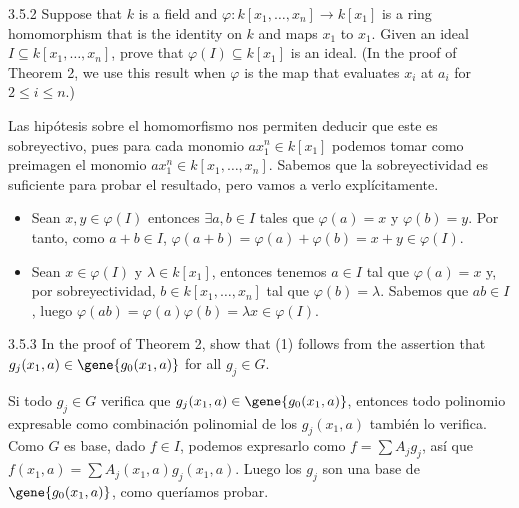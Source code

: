 \documentclass[twoside]{article}
\begin{document}
\begin{ejercicio}{3.5.2}
Suppose that $k$ is a field and $\varphi \colon k[x_1,\dots,x_n] \to k[x_1]$ is a ring homomorphism that is the identity on $k$ and maps $x_1$ to $x_1$.
Given an ideal $I \subseteq k[x_1,\dots,x_n]$, prove that $\varphi(I) \subseteq k[x_1]$ is an ideal.
(In the proof of Theorem 2, we use this result when $\varphi$ is the map that evaluates $x_i$ at $a_i$ for $2 \leq i \leq n$.)
\end{ejercicio}
\begin{solucion}
Las hipótesis sobre el homomorfismo nos permiten deducir que este es sobreyectivo, pues para cada monomio $ax_1^n \in k[x_1]$ podemos tomar como preimagen el monomio $ax_1^n \in k[x_1,\dots,x_n]$. Sabemos que la sobreyectividad es suficiente para probar el resultado, pero vamos a verlo explícitamente.
\begin{itemize}
\item Sean $x,y \in \varphi(I)$ entonces $\exists a,b\in I$ tales que $\varphi(a)=x$ y $\varphi(b)=y$. Por tanto, como $a+b \in I$, $\varphi(a+b)=\varphi(a)+\varphi(b)=x+y\in \varphi(I)$.
\item Sean $x \in \varphi(I)$ y $\lambda \in k[x_1]$, entonces tenemos $a\in I$ tal que $\varphi(a)=x$ y, por sobreyectividad, $b\in k[x_1,\dotsc,x_n]$ tal que $\varphi(b)=\lambda$. Sabemos que $ab\in I$, luego $\varphi(ab)=\varphi(a)\varphi(b)=\lambda x \in \varphi(I)$.
\end{itemize}
\end{solucion}

\newpage

\begin{ejercicio}{3.5.3}
In the proof of Theorem 2, show that (1) follows from the assertion that $g_j(x_1,a) \in \gene{g_0(x_1,a)}$ for all $g_j \in G$.
\end{ejercicio}
\begin{solucion}
Si todo $g_j \in G$ verifica que $g_j(x_1,a) \in \gene{g_0(x_1,a)}$, entonces todo polinomio expresable como combinación polinomial de los $g_j(x_1,a)$ también lo verifica. Como $G$ es base, dado $f\in I$, podemos expresarlo como $f=\sum A_jg_j$, así que $f(x_1,a)=\sum A_j(x_1,a)g_j(x_1,a)$. Luego los $g_j$ son una base de $\gene{g_0(x_1,a)}$, como queríamos probar.
\end{solucion}
\newpage
\end{document}

